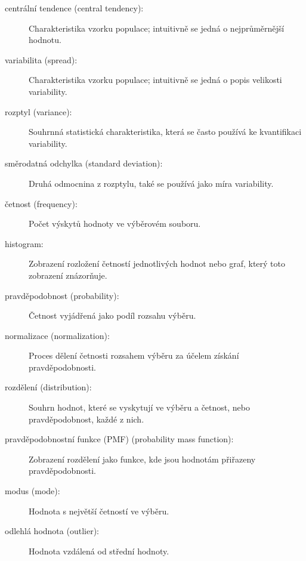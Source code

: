 \documentclass[12pt]{book}
\begin{document}
\begin{description}

\item[centrální tendence (central tendency):] Charakteristika vzorku populace;
intuitivně se jedná o nejprůměrnější hodnotu.

\item[variabilita (spread):] Charakteristika vzorku populace;
intuitivně se jedná o popis velikosti variability.

\item[rozptyl (variance):] Souhrnná statistická charakteristika, která se často používá ke kvantifikaci variability.

\item[směrodatná odchylka (standard deviation):] Druhá odmocnina z rozptylu, také se používá jako míra variability.

\item[četnost (frequency):] Počet výskytů hodnoty ve výběrovém souboru.

\item[histogram:] Zobrazení rozložení četností jednotlivých hodnot nebo graf, který toto zobrazení znázorňuje.

\item[pravděpodobnost (probability):] Četnost vyjádřená jako podíl rozsahu výběru.

\item[normalizace (normalization):] Proces dělení četnosti rozsahem výběru za účelem získání pravděpodobnosti.

\item[rozdělení (distribution):] Souhrn hodnot, které se vyskytují ve výběru a četnost, nebo pravděpodobnost,
každé z nich.


\item[pravděpodobnostní funkce (PMF) (probability mass function):] Zobrazení rozdělení jako funkce, kde jsou hodnotám přiřazeny pravděpodobnosti.

\item[modus (mode):] Hodnota s největší četností ve výběru.

\item[odlehlá hodnota (outlier):] Hodnota vzdálená od střední hodnoty.


\end{description}
\end{document}
